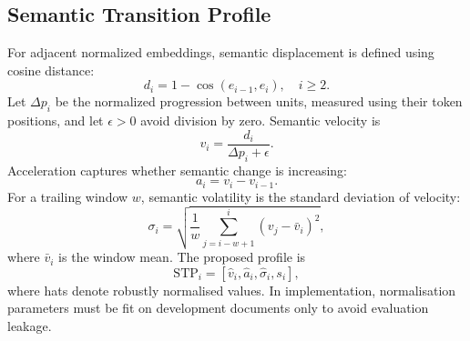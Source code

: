 \documentclass[conference]{IEEEtran}
\begin{document}
\subsection{Semantic Transition Profile}
For adjacent normalized embeddings, semantic displacement is defined using cosine distance:
\begin{equation}
d_i=1-\cos(e_{i-1},e_i), \quad i\geq2.
\end{equation}
Let $\Delta p_i$ be the normalized progression between units, measured using their token positions, and let $\epsilon>0$ avoid division by zero. Semantic velocity is
\begin{equation}
v_i=\frac{d_i}{\Delta p_i+\epsilon}.
\end{equation}
Acceleration captures whether semantic change is increasing:
\begin{equation}
a_i=v_i-v_{i-1}.
\end{equation}
For a trailing window $w$, semantic volatility is the standard deviation of velocity:
\begin{equation}
\sigma_i=\sqrt{\frac{1}{w}\sum_{j=i-w+1}^{i}(v_j-\bar v_i)^2},
\end{equation}
where $\bar v_i$ is the window mean. The proposed profile is
\begin{equation}
\mathrm{STP}_i=[\hat v_i,\hat a_i,\hat\sigma_i,s_i],
\end{equation}
where hats denote robustly normalised values. In implementation, normalisation parameters must be fit on development documents only to avoid evaluation leakage.
\end{document}
